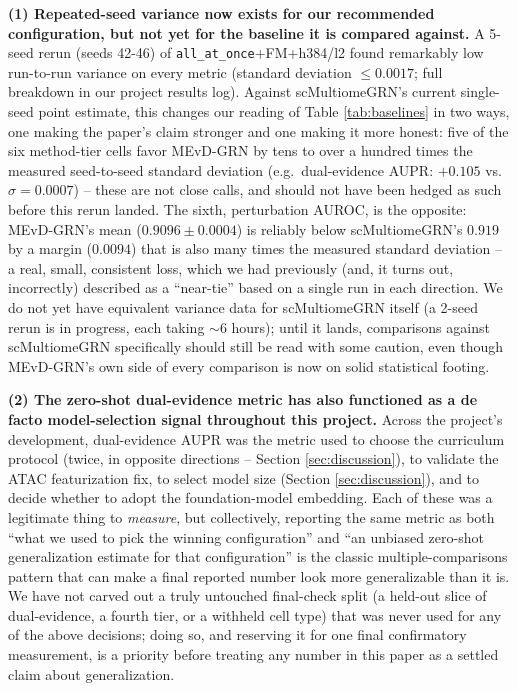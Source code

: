 \documentclass{article}
\theoremstyle{plain}
\theoremstyle{definition}
\begin{document}
\textbf{(1) Repeated-seed variance now exists for our recommended
configuration, but not yet for the baseline it is compared against.} A
5-seed rerun (seeds 42-46) of \texttt{all\_at\_once}+FM+h384/l2 found
remarkably low run-to-run variance on every metric (standard deviation
$\leq0.0017$; full breakdown in our project results log). Against
scMultiomeGRN's current single-seed point estimate, this changes our
reading of Table \ref{tab:baselines} in two ways, one making the paper's
claim stronger and one making it more honest: five of the six method-tier
cells favor MEvD-GRN by tens to over a hundred times the measured
seed-to-seed standard deviation (e.g.\ dual-evidence AUPR: $+0.105$ vs.\
$\sigma=0.0007$) -- these are not close calls, and should not have been
hedged as such before this rerun landed. The sixth, perturbation AUROC, is
the opposite: MEvD-GRN's mean ($0.9096\pm0.0004$) is reliably below
scMultiomeGRN's $0.919$ by a margin ($0.0094$) that is also many times the
measured standard deviation -- a real, small, consistent loss, which we had
previously (and, it turns out, incorrectly) described as a ``near-tie''
based on a single run in each direction. We do not yet have equivalent
variance data for scMultiomeGRN itself (a 2-seed rerun is in progress, each
taking $\sim$6 hours); until it lands, comparisons against scMultiomeGRN
specifically should still be read with some caution, even though MEvD-GRN's
own side of every comparison is now on solid statistical footing.

\textbf{(2) The zero-shot dual-evidence metric has also functioned as a de
facto model-selection signal throughout this project.} Across the
project's development, dual-evidence AUPR was the metric used to choose the
curriculum protocol (twice, in opposite directions -- Section
\ref{sec:discussion}), to validate the ATAC featurization fix, to select
model size (Section \ref{sec:discussion}), and to decide whether to adopt
the foundation-model embedding. Each of these was a legitimate thing to
\emph{measure}, but collectively, reporting the same metric as both ``what
we used to pick the winning configuration'' and ``an unbiased zero-shot
generalization estimate for that configuration'' is the classic
multiple-comparisons pattern that can make a final reported number look
more generalizable than it is. We have not carved out a truly untouched
final-check split (a held-out slice of dual-evidence, a fourth tier, or a
withheld cell type) that was never used for any of the above decisions;
doing so, and reserving it for one final confirmatory measurement, is a
priority before treating any number in this paper as a settled claim about
generalization.
\end{document}
